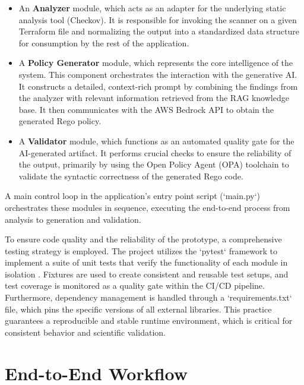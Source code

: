 \begin{itemize}
    \item An \textbf{Analyzer} module, which acts as an adapter for the underlying static analysis tool (Checkov). It is responsible for invoking the scanner on a given Terraform file and normalizing the output into a standardized data structure for consumption by the rest of the application.
    \item A \textbf{Policy Generator} module, which represents the core intelligence of the system. This component orchestrates the interaction with the generative AI. It constructs a detailed, context-rich prompt by combining the findings from the analyzer with relevant information retrieved from the RAG knowledge base. It then communicates with the AWS Bedrock API to obtain the generated Rego policy.
    \item A \textbf{Validator} module, which functions as an automated quality gate for the AI-generated artifact. It performs crucial checks to ensure the reliability of the output, primarily by using the Open Policy Agent (OPA) toolchain to validate the syntactic correctness of the generated Rego code.
\end{itemize}

A main control loop in the application's entry point script (`main.py`) orchestrates these modules in sequence, executing the end-to-end process from analysis to generation and validation.

To ensure code quality and the reliability of the prototype, a comprehensive testing strategy is employed. The project utilizes the `pytest` framework to implement a suite of unit tests that verify the functionality of each module in isolation \cite{okken_python_2017}. Fixtures are used to create consistent and reusable test setups, and test coverage is monitored as a quality gate within the CI/CD pipeline. Furthermore, dependency management is handled through a `requirements.txt` file, which pins the specific versions of all external libraries. This practice guarantees a reproducible and stable runtime environment, which is critical for consistent behavior and scientific validation.


\section{End-to-End Workflow}

